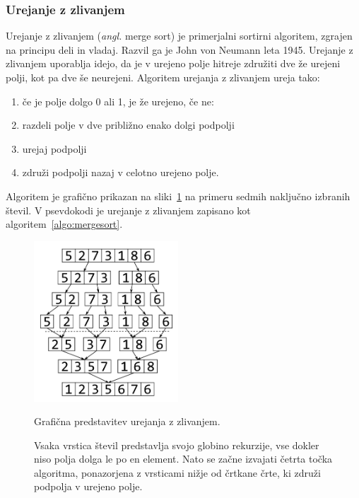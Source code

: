 \documentclass[a4paper,oneside,12pt]{article}
\begin{document}
\subsubsection{Urejanje z zlivanjem}
\label{chapter:mergesort}
Urejanje z zlivanjem (\emph{angl.} merge sort) je primerjalni sortirni algoritem, 
zgrajen na principu deli in vladaj. Razvil ga je John von Neumann leta 1945.
Urejanje z zlivanjem uporablja idejo, da je v urejeno polje hitreje združiti dve že
urejeni polji, kot pa dve še neurejeni. 
Algoritem urejanja z zlivanjem ureja tako:
\begin{enumerate}
  \item če je polje dolgo 0 ali 1, je že urejeno, če ne:
  \item razdeli polje v dve približno enako dolgi podpolji
  \item urejaj podpolji 
  \item združi podpolji nazaj v celotno urejeno polje.
\end{enumerate}
Algoritem je grafično prikazan na sliki~\ref{fig:mergesortimage} na primeru sedmih
naključno izbranih števil.
V psevdokodi je urejanje z zlivanjem zapisano kot algoritem~\ref{algo:mergesort}. 

\begin{figure}[ht]
    \begin{center}
        \includegraphics[height=60mm]{slike/mergesort.pdf}
    \end{center}
    \vspace{-0.7cm}
    \caption[Urejanje z zlivanjem]{Grafična predstavitev urejanja z zlivanjem.}
    \caption*{{\small Vsaka vrstica števil predstavlja svojo 
    globino rekurzije, vse dokler niso polja dolga le po en element.
    Nato se začne izvajati četrta točka algoritma, ponazorjena z vrsticami
    nižje od črtkane črte, ki združi podpolja v urejeno polje.}}
    \label{fig:mergesortimage}
\end{figure}
\end{document}
